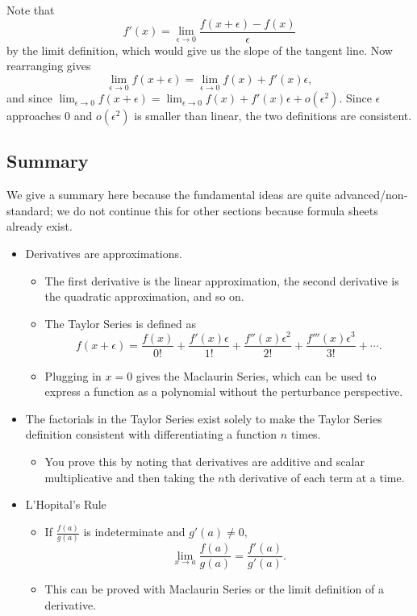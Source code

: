 \documentclass{article}
\begin{document}
\begin{pro}
Note that \[f'(x)=\lim_{\epsilon\to 0}\frac{f(x+\epsilon)-f(x)}{\epsilon}\] by the limit definition, which would give us the slope of the tangent line. Now rearranging gives
\[\lim_{\epsilon\to 0}f(x+\epsilon)=\lim_{\epsilon\to 0}f(x)+f'(x)\epsilon,\]
and since $\lim_{\epsilon\to 0}f(x+\epsilon)=\lim_{\epsilon\to 0}f(x)+f'(x)\epsilon+o(\epsilon^2).$ Since $\epsilon$ approaches $0$ and $o(\epsilon^2)$ is smaller than linear, the two definitions are consistent.
\end{pro}

\subsection{Summary}
We give a summary here because the fundamental ideas are quite advanced/non-standard; we do not continue this for other sections because formula sheets already exist. 
\begin{itemize}
\item Derivatives are approximations.
\begin{itemize}
\item The first derivative is the linear approximation, the second derivative is the quadratic approximation, and so on.
\item The Taylor Series is defined as \[f(x+\epsilon)=\frac{f(x)}{0!}+\frac{f'(x)\epsilon}{1!}+\frac{f''(x)\epsilon^2}{2!}+\frac{f'''(x)\epsilon^3}{3!}+\cdots.\]
\item Plugging in $x=0$ gives the Maclaurin Series, which can be used to express a function as a polynomial without the perturbance perspective.
\end{itemize}
\item The factorials in the Taylor Series exist solely to make the Taylor Series definition consistent with differentiating a function $n$ times.
\begin{itemize}
\item You prove this by noting that derivatives are additive and scalar multiplicative and then taking the $n$th derivative of each term at a time.
\end{itemize}
\item L'Hopital's Rule
\begin{itemize}
\item If $\frac{f(a)}{g(a)}$ is indeterminate and $g'(a)\neq 0,$
\[\lim_{x\to a}\frac{f(a)}{g(a)}=\frac{f'(a)}{g'(a)}.\]
\item This can be proved with Maclaurin Series or the limit definition of a derivative.
\end{itemize}
\end{itemize}
\end{document}

